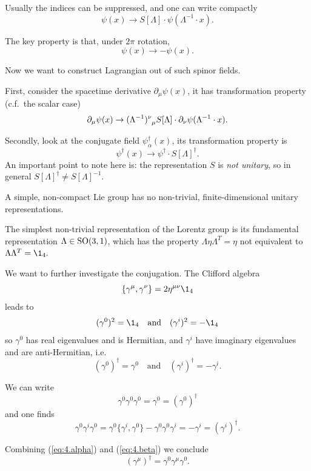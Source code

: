 \documentclass[a4paper,11pt]{article}
\begin{document}
	Usually the indices can be suppressed, and one can write compactly
		\[
			\psi(x) \to S[\Lambda] \cdot \psi(\Lambda^{-1} \cdot x).
		\]

	The key property is that, under $2 \pi$ rotation, 
	\[
		\psi(x) \to - \psi(x).
	\]
	
	Now we want to construct Lagrangian out of such spinor fields. 

	First, consider the spacetime derivative $\partial_\mu \psi(x)$, it has transformation property (c.f.\ the scalar case)
	\[
		\partial_\mu \psi(x) \to (\Lambda^{-1})\indices{^\nu_\mu} S[\Lambda]\cdot \partial_\nu \psi(\Lambda^{-1} \cdot x).
	\]
	 
	Secondly, look at the conjugate field $\psi^{\dagger}_\alpha(x)$, its transformation property is
	\begin{equation}
		\psi^{\dagger}(x) \to \psi^{\dagger} \cdot S[\Lambda]^{\dagger}.
		\label{eq:4.3.2}
	\end{equation}
	An important point to note here is: the representation $S$ is \emph{not unitary}, so in general $S[\Lambda]^{\dagger} \neq S[\Lambda]^{-1}$. 

	\begin{thm}
		A simple, non-compact Lie group has no non-trivial, finite-dimensional unitary representations.
	\end{thm}

	The simplest non-trivial representation of the Lorentz group is its fundamental representation $\Lambda \in \operatorname{SO}(3,1)$, which has the property $\Lambda \eta \Lambda^T = \eta$ not equivalent to $\Lambda \Lambda^T = \1_4.$
	
	We want to further investigate the conjugation. The Clifford algebra
	\[
		\{\gamma^\mu, \gamma^\nu\} = 2 \eta ^{\mu \nu} \1_4
	\]
	leads to 
	\[
		(\gamma^0)^2 = \1_4 \quad \text{and} \quad (\gamma^i)^2 = - \1_4
	\]
	so $\gamma^0$ has real eigenvalues and is Hermitian, and $\gamma^i$ have imaginary eigenvalues and are anti-Hermitian, i.e.\ 
	\[
		(\gamma^0)^{\dagger} = \gamma^0 \quad \text{and} \quad (\gamma^i)^{\dagger} = - \gamma^i.
	\]
	
	We can write
	\[
		\gamma^0 \gamma^0 \gamma^0 = \gamma^0 = (\gamma^0)^{\dagger}
		\tag{$\alpha$}
		\label{eq:4.alpha}
	\]
	and one finds
	\[
		\gamma^0 \gamma^i \gamma^0 = \gamma^0 \{\gamma^i, \gamma^0\} - \gamma^0 \gamma^0 \gamma^i = - \gamma^i = (\gamma^i)^{\dagger}.
		\tag{$\beta$}
		\label{eq:4.beta}
	\]
	
	Combining (\ref{eq:4.alpha}) and (\ref{eq:4.beta}) we conclude 
	\[
		(\gamma^\mu)^{\dagger} = \gamma^0 \gamma^\mu \gamma^0.
	\]
	
\end{document}
